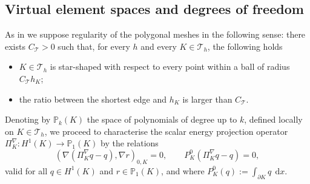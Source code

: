 \documentclass[smallextended]{svjour3}
\numberwithin{equation}{section}
\numberwithin{figure}{section}
\numberwithin{table}{section}
\newcommand\bPi{\boldsymbol{\Pi}}
\newcommand\bv{\boldsymbol{v}}
\newcommand\cT{\mathcal{T}}
\newcommand\bnabla{\boldsymbol{\nabla}}
\newcommand{\dx}{\,\mathrm{d}x}
\begin{document}
	\subsection{Virtual element spaces and degrees of freedom} \label{subsec:VEspaces}
	
	As in \cite{beirao-div17,verma24} we  suppose regularity of the polygonal meshes in the following sense:
	there exists $C_{{\mathcal T}}>0$ such that, for every $h$ and every $K\in {\mathcal T}_h$,
	the following holds
	\begin{itemize}
		\item[($A$)] $K\in{\mathcal T}_h$ is star-shaped with respect to every point within a ball of radius $C_{{\mathcal T}}h_K$;
		\item[($\tilde{A}$)] the ratio between the shortest edge and $h_K$ is larger than $C_{{\mathcal T}}$.
	\end{itemize}

	Denoting by $\mathbb{P}_k(K)$ the space of polynomials of degree up to $k$, defined locally on $K\in\cT_h$,
	we proceed to characterise the scalar energy projection operator $\Pi_{K}^{\nabla}: H^1(K) \rightarrow \mathbb{P}_1(K)$ by the relations
	\begin{equation*}%
		(\nabla (\Pi_{K}^{\nabla} q - q), \nabla r)_{0,K} = 0, \qquad P^0_K(\Pi_{K}^{\nabla} q - q)=0,
	\end{equation*}
	valid for all $q \in H^1(K)$ and $r \in \mathbb{P}_1(K)$, and where
	$ P^0_K(q):= \int_{\partial K} q\;\dx$.
	
\end{document}
